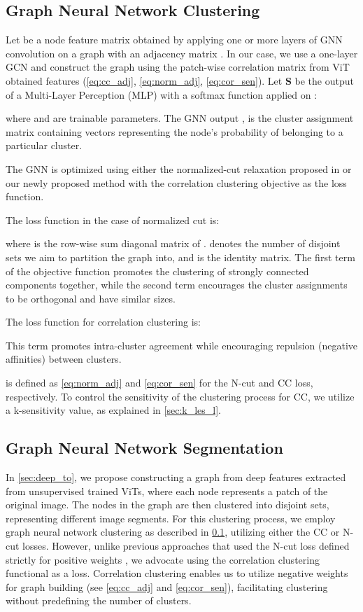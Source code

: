 \documentclass[10pt,twocolumn,letterpaper]{article}
\begin{document}
\subsection{Graph Neural Network Clustering}\label{sec:gnn_clus}
Let \textbf{} be a node feature matrix obtained by applying one or more layers of GNN convolution on a graph  with an adjacency matrix . In our case, we use a one-layer GCN and construct the graph using the patch-wise correlation matrix from ViT obtained features (\cref{eq:cc_adj}, \cref{eq:norm_adj}, \cref{eq:cor_sen}).
Let \textbf{S} be the output of a Multi-Layer Perception (MLP) with a softmax function applied on \textbf{}:

where  and  are trainable parameters. The GNN output , is the cluster assignment matrix containing vectors representing the node's probability of belonging to a particular cluster.

The GNN is optimized using either the normalized-cut relaxation proposed in \cite{bianchi2020spectral} or our newly proposed method with the correlation clustering objective as the loss function.

The loss function in the case of normalized cut is:

where  is the row-wise sum diagonal matrix of .  denotes the number of disjoint sets we aim to partition the graph into, and  is the identity matrix.
The first term of the objective function promotes the clustering of strongly connected components together, while the second term encourages the cluster assignments to be orthogonal and have similar sizes.

The loss function for correlation clustering \cite{bansal2004correlation} is:


This term promotes intra-cluster agreement while encouraging repulsion (negative affinities) between clusters.

 is defined as \cref{eq:norm_adj} and \cref{eq:cor_sen} for the N-cut and CC loss, respectively. To control the sensitivity of the clustering process for CC, we utilize a k-sensitivity value, as explained in \cref{sec:k_les_l}.


\subsection{Graph Neural Network Segmentation}

In \cref{sec:deep_to}, we propose constructing a graph from deep features extracted from unsupervised trained ViTs, where each node represents a patch of the original image. The nodes in the graph are then clustered into disjoint sets, representing different image segments. For this clustering process, we employ graph neural network clustering as described in \cref{sec:gnn_clus}, utilizing either the CC or N-cut losses. However, unlike previous approaches that used the N-cut loss defined strictly for positive weights \cite{bianchi2020spectral, melas2022deep}, we advocate using the correlation clustering functional as a loss. Correlation clustering enables us to utilize negative weights for graph building (see \cref{eq:cc_adj} and \cref{eq:cor_sen}), facilitating clustering without predefining the number of clusters.
\end{document}
